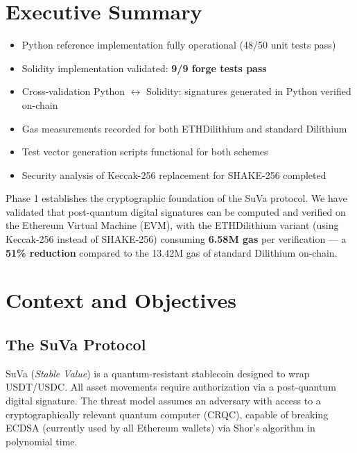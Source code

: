 \documentclass[11pt,a4paper]{article}
\begin{document}
\section{Executive Summary}

\begin{resultbox}
\begin{itemize}
  \item[$\checkmark$] Python reference implementation fully operational (48/50 unit tests pass)
  \item[$\checkmark$] Solidity implementation validated: \textbf{9/9 forge tests pass}
  \item[$\checkmark$] Cross-validation Python $\leftrightarrow$ Solidity: signatures generated in Python verified on-chain
  \item[$\checkmark$] Gas measurements recorded for both ETHDilithium and standard Dilithium
  \item[$\checkmark$] Test vector generation scripts functional for both schemes
  \item[$\checkmark$] Security analysis of Keccak-256 replacement for SHAKE-256 completed
\end{itemize}
\end{resultbox}

\vspace{0.5cm}
Phase 1 establishes the cryptographic foundation of the SuVa protocol. We have validated that post-quantum digital signatures can be computed and verified on the Ethereum Virtual Machine (EVM), with the ETHDilithium variant (using Keccak-256 instead of SHAKE-256) consuming \textbf{6.58M gas} per verification — a \textbf{51\% reduction} compared to the 13.42M gas of standard Dilithium on-chain.

\section{Context and Objectives}

\subsection{The SuVa Protocol}

SuVa (\textit{Stable Value}) is a quantum-resistant stablecoin designed to wrap USDT/USDC. All asset movements require authorization via a post-quantum digital signature. The threat model assumes an adversary with access to a cryptographically relevant quantum computer (CRQC), capable of breaking ECDSA (currently used by all Ethereum wallets) via Shor's algorithm in polynomial time.
\end{document}
